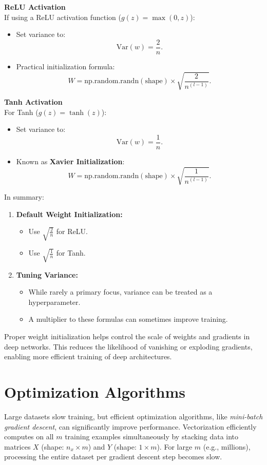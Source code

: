 \documentclass[letterpaper,12pt,notitlepage,twoside]{report}
\begin{document}
\textbf{ReLU Activation} \\
If using a ReLU activation function (\( g(z) = \max(0, z) \)):
\begin{itemize}
    \item Set variance to:
    \[
    \text{Var}(w) = \frac{2}{n}.
    \]
    \item Practical initialization formula:
    \[
    W = \text{np.random.randn}(\text{shape}) \times \sqrt{\frac{2}{n^{(l-1)}}}.
    \]
\end{itemize}

\textbf{Tanh Activation} \\
For Tanh (\( g(z) = \tanh(z) \)):
\begin{itemize}
    \item Set variance to:
    \[
    \text{Var}(w) = \frac{1}{n}.
    \]
    \item Known as \textbf{Xavier Initialization}:
    \[
    W = \text{np.random.randn}(\text{shape}) \times \sqrt{\frac{1}{n^{(l-1)}}}.
    \]
\end{itemize}

In summary: \\
\begin{enumerate}
    \item \textbf{Default Weight Initialization:}
    \begin{itemize}
        \item Use \( \sqrt{\frac{2}{n}} \) for ReLU.
        \item Use \( \sqrt{\frac{1}{n}} \) for Tanh.
    \end{itemize}
    \item \textbf{Tuning Variance:}
    \begin{itemize}
        \item While rarely a primary focus, variance can be treated as a hyperparameter.
        \item A multiplier to these formulas can sometimes improve training.
    \end{itemize}
\end{enumerate}

Proper weight initialization helps control the scale of weights and gradients in deep networks. This reduces the likelihood of vanishing or exploding gradients, enabling more efficient training of deep architectures.

\section{Optimization Algorithms}
Large datasets slow training, but efficient optimization algorithms, like \emph{mini-batch gradient descent}, can significantly improve performance. Vectorization efficiently computes on all $m$ training examples simultaneously by stacking data into matrices $X$ (shape: $n_x \times m$) and $Y$ (shape: $1 \times m$). For large $m$ (e.g., millions), processing the entire dataset per gradient descent step becomes slow. 
\end{document}
